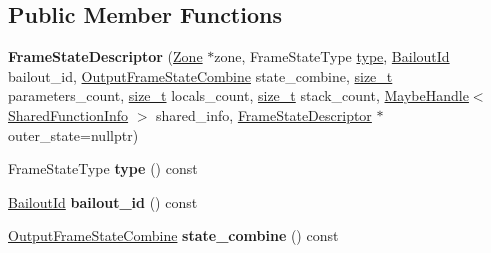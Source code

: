 \subsection*{Public Member Functions}
\begin{DoxyCompactItemize}
\item 
\mbox{\label{classv8_1_1internal_1_1compiler_1_1FrameStateDescriptor_a16d526494c530deca2c444c130670176}} 
{\bfseries Frame\+State\+Descriptor} (\mbox{\hyperlink{classv8_1_1internal_1_1Zone}{Zone}} $\ast$zone, Frame\+State\+Type \mbox{\hyperlink{classstd_1_1conditional_1_1type}{type}}, \mbox{\hyperlink{classv8_1_1internal_1_1BailoutId}{Bailout\+Id}} bailout\+\_\+id, \mbox{\hyperlink{classv8_1_1internal_1_1compiler_1_1OutputFrameStateCombine}{Output\+Frame\+State\+Combine}} state\+\_\+combine, \mbox{\hyperlink{classsize__t}{size\+\_\+t}} parameters\+\_\+count, \mbox{\hyperlink{classsize__t}{size\+\_\+t}} locals\+\_\+count, \mbox{\hyperlink{classsize__t}{size\+\_\+t}} stack\+\_\+count, \mbox{\hyperlink{classv8_1_1internal_1_1MaybeHandle}{Maybe\+Handle}}$<$ \mbox{\hyperlink{classv8_1_1internal_1_1SharedFunctionInfo}{Shared\+Function\+Info}} $>$ shared\+\_\+info, \mbox{\hyperlink{classv8_1_1internal_1_1compiler_1_1FrameStateDescriptor}{Frame\+State\+Descriptor}} $\ast$outer\+\_\+state=nullptr)
\item 
\mbox{\label{classv8_1_1internal_1_1compiler_1_1FrameStateDescriptor_adebdcdcd09557866fc6295c7249703f3}} 
Frame\+State\+Type {\bfseries type} () const
\item 
\mbox{\label{classv8_1_1internal_1_1compiler_1_1FrameStateDescriptor_ae7a44c7199aba1eb0ddef18795052a63}} 
\mbox{\hyperlink{classv8_1_1internal_1_1BailoutId}{Bailout\+Id}} {\bfseries bailout\+\_\+id} () const
\item 
\mbox{\label{classv8_1_1internal_1_1compiler_1_1FrameStateDescriptor_a0feda937c8a7c1c97864a67889fb50c5}} 
\mbox{\hyperlink{classv8_1_1internal_1_1compiler_1_1OutputFrameStateCombine}{Output\+Frame\+State\+Combine}} {\bfseries state\+\_\+combine} () const
\item 
\mbox{\label{classv8_1_1internal_1_1compiler_1_1FrameStateDescriptor_a1c19fee9b0d5e09bf83a0faa5da62d56}} 

\end{DoxyCompactItemize}
